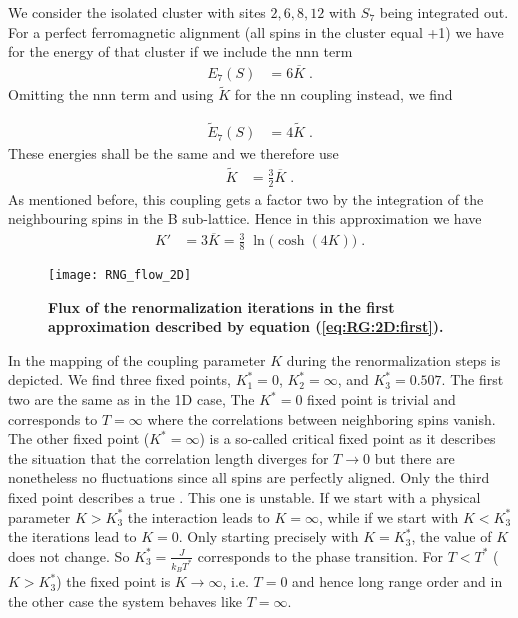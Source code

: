 We consider the isolated cluster with sites $2,6,8,12$ with $S_{7}$ being integrated out. For a perfect ferromagnetic alignment (all spins in the cluster equal +1)
we have for the energy of that cluster if we include the nnn term
%
\begin{align*}
E_{7}(S) &= 6 \overline K \;.
\end{align*}
%
Omitting the nnn term and using $\tilde K$ for the nn coupling instead, we find

%
\begin{align*}
\tilde E_{7}(S) &= 4 \tilde K \;.
\end{align*}
%
These energies shall be the same and we therefore use
%
\begin{align*}
\tilde K &= \frac{3}{2} \overline K\;. 
\end{align*}
%
As mentioned before, this coupling gets a factor two
by the integration of the neighbouring spins in the B sub-lattice.
Hence in this approximation we have
%
\begin{align}\label{eq:RG:2D:first}
K' &= 3 \overline K  = \frac{3}{8} \; \ln\bigg(  \cosh(4K)\bigg)\;.
\end{align}
%


%
\begin{figure}[htbp]
\begin{center}
\texttt{[image: RNG\_flow\_2D]}
\caption{\bf Flux of the renormalization iterations in the first approximation
described by equation (\ref{eq:RG:2D:first}).
}
\label{fig:rng:ising:2d}
\end{center}
\end{figure}



In  the mapping of the coupling parameter $K$ during the renormalization
steps is depicted.
We find three fixed points, $K^*_{1}=0$, $K_{2}^{*}=\infty$, and $K^{*}_{3}=0.507$. 
The first two are the same as in the 1D case, 
The $K^{*}=0$ fixed point is trivial and corresponds to $T=\infty$ where the correlations between neighboring spins vanish. The other fixed point ($K^{*}=\infty$) is a so-called critical fixed point as it describes the situation that the correlation length diverges for $T\to 0$
but there are nonetheless no fluctuations since all spins are perfectly aligned.
Only the third  fixed point describes a true . This one is   unstable. If we start with a physical parameter $K>K^{*}_{3}$ the interaction leads to $K=\infty$, while if we start with $K<K_{3}^{*}$ the iterations lead to $K=0$. Only starting precisely with $K=K^{*}_{3}$, the value of $K$ does not change.
So $K_{3}^{*} = \frac{J}{k_{B}T^{*}}$ corresponds to the phase transition. For $T<T^{*}$ 
($K>K^{*}_{3}$) the fixed point is $K\to \infty$, i.e. $T=0$ and hence long range order 
and in the other case the system behaves like $T=\infty$. 

